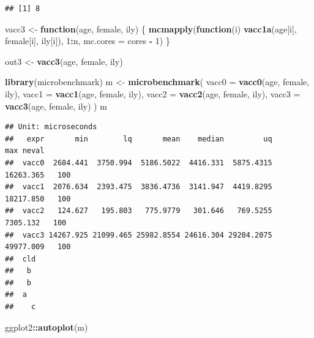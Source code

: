 \documentclass[]{book}
\newenvironment{Shaded}{\begin{snugshade}}{\end{snugshade}}
\newcommand{\KeywordTok}[1]{\textcolor[rgb]{0.13,0.29,0.53}{\textbf{#1}}}
\newcommand{\DataTypeTok}[1]{\textcolor[rgb]{0.13,0.29,0.53}{#1}}
\newcommand{\DecValTok}[1]{\textcolor[rgb]{0.00,0.00,0.81}{#1}}
\newcommand{\StringTok}[1]{\textcolor[rgb]{0.31,0.60,0.02}{#1}}
\newcommand{\ControlFlowTok}[1]{\textcolor[rgb]{0.13,0.29,0.53}{\textbf{#1}}}
\newcommand{\OperatorTok}[1]{\textcolor[rgb]{0.81,0.36,0.00}{\textbf{#1}}}
\newcommand{\NormalTok}[1]{#1}
\theoremstyle{definition}
\theoremstyle{definition}
\theoremstyle{definition}
\theoremstyle{remark}
\begin{document}
\begin{verbatim}
## [1] 8
\end{verbatim}

\begin{Shaded}
\begin{Highlighting}[]
\NormalTok{vacc3 <-}\StringTok{ }\ControlFlowTok{function}\NormalTok{(age, female, ily) \{}
  \KeywordTok{mcmapply}\NormalTok{(}\ControlFlowTok{function}\NormalTok{(i) }\KeywordTok{vacc1a}\NormalTok{(age[i], female[i], ily[i]), }\DecValTok{1}\OperatorTok{:}\NormalTok{n, }\DataTypeTok{mc.cores =}\NormalTok{ cores }\OperatorTok{-}\StringTok{ }\DecValTok{1}\NormalTok{)}
\NormalTok{\}}

\NormalTok{out3 <-}\StringTok{ }\KeywordTok{vacc3}\NormalTok{(age, female, ily)}
\end{Highlighting}
\end{Shaded}

\begin{Shaded}
\begin{Highlighting}[]
\KeywordTok{library}\NormalTok{(microbenchmark)}
\NormalTok{m <-}\StringTok{ }\KeywordTok{microbenchmark}\NormalTok{(}
  \DataTypeTok{vacc0 =} \KeywordTok{vacc0}\NormalTok{(age, female, ily),}
  \DataTypeTok{vacc1 =} \KeywordTok{vacc1}\NormalTok{(age, female, ily),}
  \DataTypeTok{vacc2 =} \KeywordTok{vacc2}\NormalTok{(age, female, ily),}
  \DataTypeTok{vacc3 =} \KeywordTok{vacc3}\NormalTok{(age, female, ily)}
\NormalTok{)}
\NormalTok{m}
\end{Highlighting}
\end{Shaded}

\begin{verbatim}
## Unit: microseconds
##   expr       min        lq       mean    median         uq       max neval
##  vacc0  2684.441  3750.994  5186.5022  4416.331  5875.4315 16263.365   100
##  vacc1  2076.634  2393.475  3836.4736  3141.947  4419.8295 18217.850   100
##  vacc2   124.627   195.803   775.9779   301.646   769.5255  7305.132   100
##  vacc3 14267.925 21099.465 25982.8554 24616.304 29204.2075 49977.009   100
##  cld
##   b 
##   b 
##  a  
##    c
\end{verbatim}

\begin{Shaded}
\begin{Highlighting}[]
\NormalTok{ggplot2}\OperatorTok{::}\KeywordTok{autoplot}\NormalTok{(m)}
\end{Highlighting}
\end{Shaded}
\end{document}
